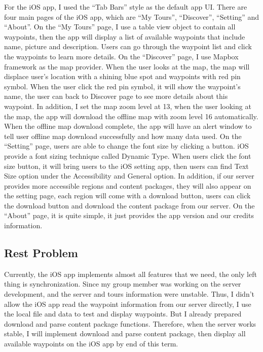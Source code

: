 \documentclass[letterpaper, 10pt,titlepage]{article}
\begin{document}
For the iOS app, I used the “Tab Bars” style as the default app UI. There are four main pages of the iOS app, which are “My Tours”, “Discover”, “Setting” and “About”. On the “My Tours” page, I use a table view object to contain all waypoints, then the app will display a list of available waypoints that include name, picture and description. Users can go through the waypoint list and click the waypoints to learn more details. On the “Discover” page, I use Mapbox framework as the map provider. When the user looks at the map, the map will displace user’s location with a shining blue spot and waypoints with red pin symbol. When the user click the red pin symbol, it will show the waypoint’s name, the user can back to Discover page to see more details about this waypoint. In addition, I set the map zoom level at 13, when the user looking at the map, the app will download the offline map with zoom level 16 automatically. When the offline map download complete, the app will have an alert window to tell user offline map download successfully and how many data used. On the “Setting” page, users are able to change the font size by clicking a button. iOS provide a font sizing technique called Dynamic Type. When users click the font size button, it will bring users to the iOS setting app, then users can find Text Size option under the Accessibility and General option. In addition, if our server provides more accessible regions and content packages, they will also appear on the setting page, each region will come with a download button, users can click the download button and download the content package from our server. On the “About” page, it is quite simple, it just provides the app version and our credits information. 

\subsection{Rest Problem}
Currently, the iOS app implements almost all features that we need, the only left thing is synchronization. Since my group member was working on the server development, and the server and tours information were unstable. Thus, I didn’t allow the iOS app read the waypoint information from our server directly, I use the local file and data to test and display waypoints. But I already prepared download and parse content package functions. Therefore, when the server works stable, I will implement download and parse content package, then display all available waypoints on the iOS app by end of this term. 
\end{document}
